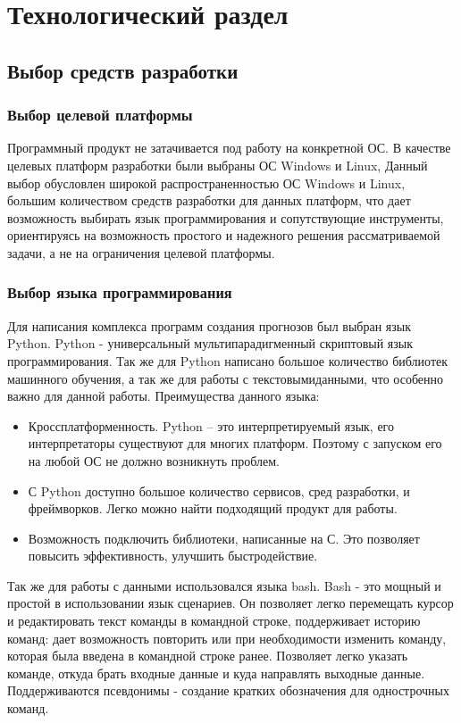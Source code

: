 \chapter{Технологический раздел}
\section{Выбор средств разработки}
\subsection{Выбор целевой платформы}
Программный продукт  не затачивается под работу на конкретной ОС. В качестве целевых платформ разработки были выбраны ОС Windows и Linux, Данный выбор обусловлен широкой распространенностью ОС Windows и Linux, большим количеством средств разработки для данных платформ, что дает возможность выбирать
язык программирования и сопутствующие инструменты, ориентируясь на возможность простого и надежного решения рассматриваемой
задачи, а не на ограничения целевой платформы.


\subsection{Выбор языка программирования}
Для написания комплекса программ создания прогнозов был выбран язык Python.
Python - универсальный мультипарадигменный скриптовый язык программирования. Так же для Python написано большое количество библиотек машинного обучения, а так же для работы с текстовымиданными, что особенно важно для данной работы.
Преимущества данного языка:
\begin{itemize}
	\item Кроссплатформенность. Python – это интерпретируемый язык, его интерпретаторы существуют для многих платформ. Поэтому с запуском его на любой ОС не должно возникнуть проблем.
	\item С Python доступно большое количество сервисов, сред разработки, и фреймворков. Легко можно найти подходящий продукт для работы.
	\item Возможность подключить библиотеки, написанные на С. Это позволяет повысить эффективность, улучшить быстродействие.
\end{itemize}



Так же для работы с данными использовался языка bash. Bash - это мощный и простой в использовании язык сценариев. Он позволяет 	 легко перемещать курсор и редактировать текст команды в командной строке, поддерживает историю команд: дает возможность повторить или при необходимости изменить команду, которая была введена в командной строке ранее. Позволяет легко указать команде, откуда брать входные данные и куда направлять выходные данные. Поддерживаются псевдонимы - создание кратких обозначения для однострочных команд.

